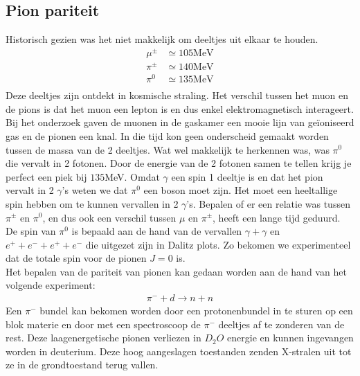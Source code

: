 \documentclass[../main.tex]{subfiles}
\begin{document}
\subsection{Pion pariteit}%
\label{sub:pion_pariteit}

Historisch gezien was het niet makkelijk om deeltjes uit elkaar te houden.
\begin{equation}
    \begin{aligned}
        \label{eq:pion_mass}
        \mu^\pm &\simeq 105 \text{MeV}\\
        \pi^\pm &\simeq 140 \text{MeV}\\
        \pi^0   &\simeq 135 \text{MeV}\\
    \end{aligned}
\end{equation}
Deze deeltjes zijn ontdekt in kosmische straling. Het verschil tussen het muon en de pions is dat het muon een lepton is en dus enkel elektromagnetisch interageert. Bij het onderzoek gaven de muonen in de gaskamer een mooie lijn van geïoniseerd gas en de pionen een knal. In die tijd kon geen onderscheid gemaakt worden tussen de massa van de 2 deeltjes. Wat wel makkelijk te herkennen was, was $\pi^0$ die vervalt in 2 fotonen. Door de energie van de 2 fotonen samen te tellen krijg je perfect een piek bij $135$MeV. Omdat $\gamma$ een spin 1 deeltje is en dat het pion vervalt in 2 $\gamma$'s weten we dat $\pi^0$ een boson moet zijn. Het moet een heeltallige spin hebben om te kunnen vervallen in 2 $\gamma$'s. Bepalen of er een relatie was tussen $\pi^\pm$ en $\pi^0$, en dus ook een verschil tussen $\mu$ en $\pi^\pm$, heeft een lange tijd geduurd. De spin van $\pi^0$ is bepaald aan de hand van de vervallen $\gamma+\gamma$ en $e^++e^-+e^++e^-$ die uitgezet zijn in Dalitz plots. Zo bekomen we experimenteel dat de totale spin voor de pionen $J=0$ is.\\
Het bepalen van de pariteit van pionen kan gedaan worden aan de hand van het volgende experiment:
\begin{equation}
    \begin{aligned}
        \label{eq:pion_pariteit}
        \pi^- + d \rightarrow n + n
    \end{aligned}
\end{equation}
Een $\pi^-$ bundel kan bekomen worden door een protonenbundel in te sturen op een blok materie en door met een spectroscoop de $\pi^-$ deeltjes af te zonderen van de rest. Deze laagenergetische pionen verliezen in $D_2O$ energie en kunnen ingevangen worden in deuterium. Deze hoog aangeslagen toestanden zenden X-stralen uit tot ze in de grondtoestand terug vallen.
\end{document}
